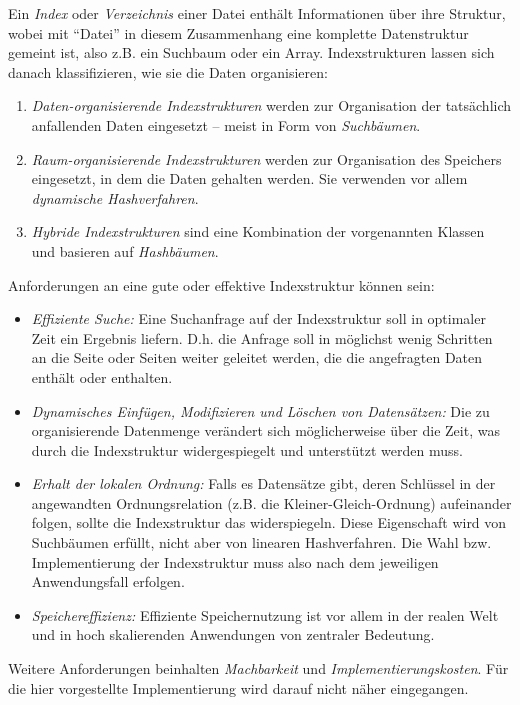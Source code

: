 Ein \textit{Index} oder \textit{Verzeichnis} einer Datei enthält Informationen über ihre Struktur, wobei mit "`Datei"' in diesem Zusammenhang eine komplette Datenstruktur gemeint ist, also z.B. ein Suchbaum oder ein Array. Indexstrukturen lassen sich danach klassifizieren, wie sie die Daten organisieren: 
\begin{enumerate}
	\item \textit{Daten-organisierende Indexstrukturen} werden zur Organisation der tatsächlich anfallenden Daten eingesetzt -- meist in Form von \textit{Suchbäumen}. 
	\item \textit{Raum-organisierende Indexstrukturen} werden zur Organisation des Speichers eingesetzt, in dem die Daten gehalten werden. Sie verwenden vor allem \textit{dynamische Hashverfahren}. 
	\item \textit{Hybride Indexstrukturen} sind eine Kombination der vorgenannten Klassen und basieren auf \textit{Hashbäumen}.   
\end{enumerate}
Anforderungen an eine gute oder effektive Indexstruktur können sein: 
\begin{itemize}
	\item \textit{Effiziente Suche:} Eine Suchanfrage auf der Indexstruktur soll in optimaler Zeit ein Ergebnis liefern. D.h. die Anfrage soll in möglichst wenig Schritten an die Seite oder Seiten weiter geleitet werden, die die angefragten Daten enthält oder enthalten.
	\item \textit{Dynamisches Einfügen, Modifizieren und Löschen von Datensätzen:} Die zu organisierende Datenmenge verändert sich möglicherweise über die Zeit, was durch die Indexstruktur widergespiegelt und unterstützt werden muss.  
	\item \textit{Erhalt der lokalen Ordnung:} Falls es Datensätze gibt, deren Schlüssel in der angewandten Ordnungsrelation (z.B. die Kleiner-Gleich-Ordnung) aufeinander folgen, sollte die Indexstruktur das widerspiegeln. Diese Eigenschaft wird von Suchbäumen erfüllt, nicht aber von linearen Hashverfahren. Die Wahl bzw. Implementierung der Indexstruktur muss also nach dem jeweiligen Anwendungsfall erfolgen. 
	\item \textit{Speichereffizienz:} Effiziente Speichernutzung ist vor allem in der realen Welt und in hoch skalierenden Anwendungen von zentraler Bedeutung. 
\end{itemize}
Weitere Anforderungen beinhalten \textit{Machbarkeit} und \textit{Implementierungskosten}. Für die hier vorgestellte Implementierung wird darauf nicht näher eingegangen.  
\cite{Ottmann2012}
